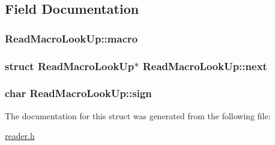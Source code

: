 \subsection{Field Documentation}
\hypertarget{structReadMacroLookUp_a92abc2fcc76ad77e9ed0fb234a17ec4b}{
\subsubsection[{macro}]{ Read\+Macro\+Look\+Up\+::macro}}\label{structReadMacroLookUp_a92abc2fcc76ad77e9ed0fb234a17ec4b}
\hypertarget{structReadMacroLookUp_a625eb8099554d48e15723ee9fe5edf83}{
\subsubsection[{next}]{\setlength{\rightskip}{0pt plus 5cm}struct {\bf Read\+Macro\+Look\+Up}$\ast$ Read\+Macro\+Look\+Up\+::next}}\label{structReadMacroLookUp_a625eb8099554d48e15723ee9fe5edf83}
\hypertarget{structReadMacroLookUp_a42c38e43d913109ab5c342821518b3eb}{
\subsubsection[{sign}]{\setlength{\rightskip}{0pt plus 5cm}char Read\+Macro\+Look\+Up\+::sign}}\label{structReadMacroLookUp_a42c38e43d913109ab5c342821518b3eb}


The documentation for this struct was generated from the following file\+:\begin{DoxyCompactItemize}
\item 
\hyperlink{reader_8h}{reader.\+h}\end{DoxyCompactItemize}
